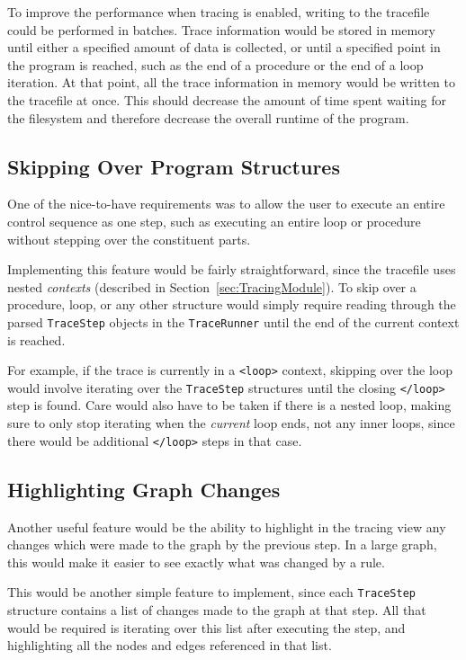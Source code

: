 \documentclass[authoryearcitations]{UoYCSproject}
\begin{document}
To improve the performance when tracing is enabled, writing to the tracefile
could be performed in batches. Trace information would be stored in memory until
either a specified amount of data is collected, or until a specified point in 
the program is reached, such as the end of a procedure or the end of a loop
iteration. At that point, all the trace information in memory would be written
to the tracefile at once. This should decrease the amount of time spent waiting
for the filesystem and therefore decrease the overall runtime of the program.

\subsection{Skipping Over Program Structures}
\label{sec:SkippingOverProgramStructures}

One of the nice-to-have requirements was to allow the user to execute an entire
control sequence as one step, such as executing an entire loop or procedure
without stepping over the constituent parts.

Implementing this feature would be fairly straightforward, since the tracefile
uses nested \emph{contexts} (described in Section~\ref{sec:TracingModule}).
To skip over a procedure, loop, or any other structure would simply require
reading through the parsed \texttt{TraceStep} objects in the \texttt{TraceRunner}
until the end of the current context is reached.

For example, if the trace is currently in a \texttt{<loop>} context, skipping
over the loop would involve iterating over the \texttt{TraceStep} structures
until the closing \texttt{</loop>} step is found. Care would also have to be
taken if there is a nested loop, making sure to only stop iterating when the
\emph{current} loop ends, not any inner loops, since there would be additional
\texttt{</loop>} steps in that case.

\subsection{Highlighting Graph Changes}
\label{sec:HighlightingGraphChanges}

Another useful feature would be the ability to highlight in the tracing
view any changes which were made to the graph by the previous step. In a large
graph, this would make it easier to see exactly what was changed by a rule.

This would be another simple feature to implement, since each \texttt{TraceStep}
structure contains a list of changes made to the graph at that step. All that
would be required is iterating over this list after executing the step, and
highlighting all the nodes and edges referenced in that list.
\end{document}
